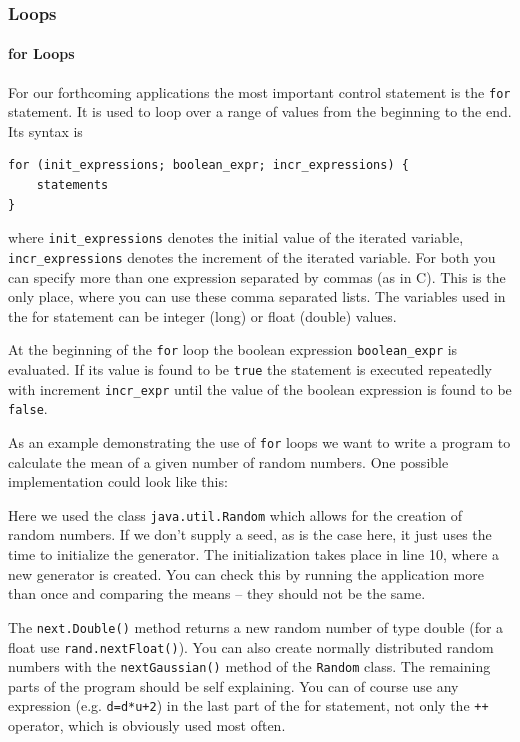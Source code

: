 \subsubsection{Loops}
\paragraph{for Loops}
For our forthcoming applications the most important control statement
is the \verb|for| statement. It is used to loop over a range of values
from the beginning to the end. Its syntax is
\begin{verbatim}
for (init_expressions; boolean_expr; incr_expressions) {
    statements
}
\end{verbatim}
where \verb|init_expressions| denotes the initial value of the iterated
variable, \verb|incr_expressions| denotes the increment of the iterated
variable. For both you can specify more than one expression separated
by commas (as in C). This is the only place, where you can use these comma
separated lists. The variables used in the for statement can be 
integer (long) or float (double) values. 

At the beginning of the \verb|for| loop the boolean expression
\verb|boolean_expr| is evaluated. If its value is found to be 
\verb|true| the statement is executed repeatedly with increment
\verb|incr_expr| until the value of the boolean expression is found to
be \verb|false|.

As an example demonstrating the use of
\verb|for| loops we want to write a program to calculate the mean of
a given number of random numbers. One possible implementation
could look like this:

Here we used the class \verb|java.util.Random| which allows for
the creation of random numbers. If we don't supply a seed, as is the
case here, it just uses the time to initialize the generator. The
initialization takes place in line 10, where a new generator is created.
You can check this by running the application more than once and comparing
the means -- they should not be the same. 

The \verb|next.Double()| method returns a new random number of type
double (for a float use \verb|rand.nextFloat()|). You can also create normally 
distributed random numbers with the \verb|nextGaussian()| method of
the \verb|Random| class.
The remaining parts of the program should be self explaining. You can of
course use any expression (e.g. \verb|d=d*u+2|) 
in the last part of the for statement, not only
the \verb|++| operator, which is obviously used most often. 

